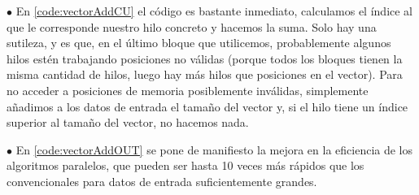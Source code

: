 $\bullet$ En \ref{code:vectorAddCU} el código es bastante inmediato, calculamos el índice al que le corresponde nuestro hilo concreto y hacemos la suma. Solo hay una sutileza, y es que, en el último bloque que utilicemos, probablemente algunos hilos estén trabajando posiciones no válidas (porque todos los bloques tienen la misma cantidad de hilos, luego hay más hilos que posiciones en el vector). Para no acceder a posiciones de memoria posiblemente inválidas, simplemente añadimos a los datos de entrada el tamaño del vector y, si el hilo tiene un índice superior al tamaño del vector, no hacemos nada.

$\bullet$ En \ref{code:vectorAddOUT} se pone de manifiesto la mejora en la eficiencia de los algoritmos paralelos, que pueden ser hasta 10 veces más rápidos que los convencionales para datos de entrada suficientemente grandes.




